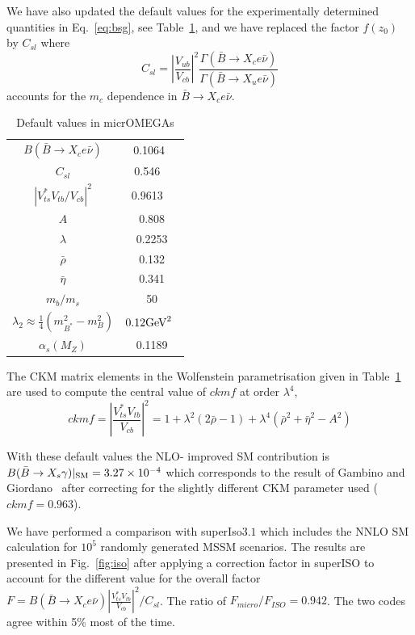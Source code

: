 \documentclass[12pt,a4paper]{article}
\begin{document}
We have also updated the default values for the experimentally determined quantities in
Eq.~\ref{eq:bsg}, see Table~\ref{tab:def}, and we have replaced the factor $f(z_0)$ by $C_{sl}$ where
\begin{equation}
C_{sl}=\left|\frac{V_{ub}}{V_{cb}}\right|^2 \frac{\Gamma(\bar{B}\rightarrow X_c e\bar\nu)}{\Gamma(\bar{B}\rightarrow X_u e\bar\nu)}
\end{equation}
accounts for the $m_c$ dependence in $\bar{B}\rightarrow X_c e\bar\nu$.


\begin{table}
\begin{center}
\begin{tabular}{|c|c|}
\hline
$B(\bar{B}\rightarrow X_c e\bar\nu)$ & 0.1064~\cite{Nakamura:2010zzi}\\
$C_{sl}$ & 0.546 ~\cite{Gambino:2008fj}\\
$|V_{ts}^*V_{tb}/V_{cb}|^2$ & 0.9613 ~\cite{Nakamura:2010zzi}\\
$A$& 0.808\\
$\lambda$ & 0.2253\\
$\bar{\rho}$ & 0.132\\
$\bar{\eta}$ &0.341 \\
$m_b/m_s$  & 50\\
$\lambda_2\approx \frac{1}{4} (m^2_{B^*}-m^2_B)$ &  $0.12 {\rm GeV}^2$~\cite{Yao:2006px}\\
$\alpha_s(M_Z)$ &0.1189 \\\hline
\end{tabular}
\caption{Default values in micrOMEGAs }
\end{center}
\label{tab:def}
\end{table}

The CKM matrix elements in the Wolfenstein parametrisation given in Table~\ref{tab:def}
are used to compute the central value of $ckmf$  at order $\lambda^4$,
\begin{equation}
ckmf=\left|\frac{V_{ts}^*V_{tb}}{V_{cb}}\right|^2=1+\lambda^2 (2\bar{\rho}-1) +
\lambda^4 (\bar\rho^2+\bar\eta^2-A^2)
\end{equation}




With these default values  the NLO- improved SM contribution 
is $B(\bar{B}\rightarrow X_s \gamma)|_{\rm SM}=3.27\times 10^{-4}$ which corresponds to the result of Gambino
and Giordano~\cite{Gambino:2008fj} after correcting for the slightly different CKM parameter used ($ckmf=0.963$).

We have performed a comparison with superIso$3.1$ which includes the NNLO SM calculation for 
$10^5$ randomly generated MSSM scenarios. The results are presented in Fig.~\ref{fig:iso}  after applying a
correction factor in superISO to account for the different value for the overall factor
$F=B(\bar{B}\rightarrow X_c e\bar\nu) \left|\frac{V_{ts}^* V_{tb}}
{V_{cb}}\right|^2/C_{sl}$. The ratio of $F_{micro}/F_{ISO}=0.942$.
The two codes agree within 5\% most of the time. 
\end{document}
